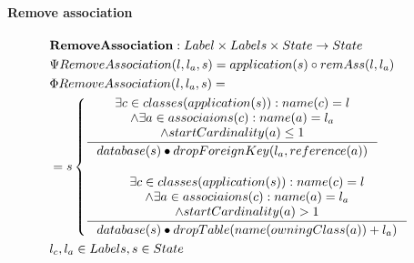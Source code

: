 \documentclass[11pt]{article}
\begin{document}
\paragraph{Remove association} 
\begin{align*}
&    \mathbf{RemoveAssociation} : Label \times Labels \times State \rightarrow State \\ 
&    \Psi RemoveAssociation(l, l_a, s) = application(s) \circ remAss(l, l_a) \\
&    \Phi RemoveAssociation(l, l_a, s) = \\
&= s\begin{cases}
     	\inference{\exists c \in classes(application(s)) : name(c) = l \\
     	\wedge \exists a \in associaions(c) : name(a) = l_a  \\
     	\wedge startCardinality(a) \leq 1 \\}{database(s) \bullet dropForeignKey(l_a, reference(a))} \\\\
     	\inference{\exists c \in classes(application(s)) : name(c) = l \\
     	\wedge \exists a \in associaions(c) : name(a) = l_a  \\
     	\wedge startCardinality(a) > 1}{database(s) \bullet dropTable(name(owningClass(a))+l_a)} 
     \end{cases}\\
&    l_c, l_a \in Labels, s \in State
\end{align*}
\end{document}
